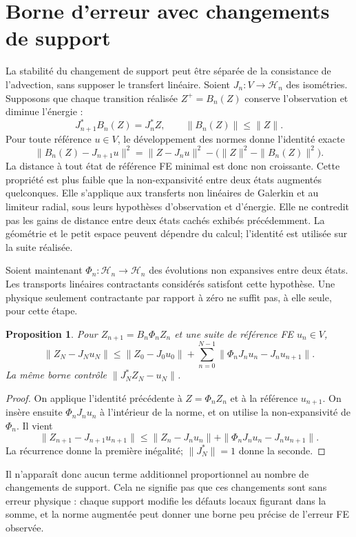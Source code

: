 \documentclass[11pt,a4paper]{article}
\newtheorem{proposition}{Proposition}
\begin{document}
\section{Borne d'erreur avec changements de support}
La stabilité du changement de support peut être séparée de la
consistance de l'advection, sans supposer le transfert linéaire.
Soient $J_n:V\to\mathcal H_n$ des isométries. Supposons que chaque
transition réalisée $Z^+=B_n(Z)$ conserve l'observation et diminue
l'énergie :
\[
 J_{n+1}^*B_n(Z)=J_n^*Z,\qquad \|B_n(Z)\|\leq\|Z\|.
\]
Pour toute référence $u\in V$, le développement des normes donne
l'identité exacte
\[
 \|B_n(Z)-J_{n+1}u\|^2
 =\|Z-J_nu\|^2-\bigl(\|Z\|^2-\|B_n(Z)\|^2\bigr).
\]
La distance à tout état de référence FE minimal est donc non croissante.
Cette propriété est plus faible que la non-expansivité entre deux
états augmentés quelconques. Elle s'applique aux transferts non linéaires
de Galerkin et au limiteur radial, sous leurs hypothèses d'observation
et d'énergie. Elle ne contredit pas les gains de distance entre deux
états cachés exhibés précédemment. La géométrie et le petit espace
peuvent dépendre du calcul; l'identité est utilisée sur la suite réalisée.

Soient maintenant $\Phi_n:\mathcal H_n\to\mathcal H_n$ des évolutions
non expansives entre deux états. Les transports linéaires contractants
considérés satisfont cette hypothèse. Une physique seulement contractante
par rapport à zéro ne suffit pas, à elle seule, pour cette étape.

\begin{proposition}
Pour $Z_{n+1}=B_n\Phi_n Z_n$ et une suite de référence FE $u_n\in V$,
\[
 \|Z_N-J_Nu_N\|\leq\|Z_0-J_0u_0\|
 +\sum_{n=0}^{N-1}\|\Phi_nJ_nu_n-J_nu_{n+1}\|.
\]
La même borne contrôle $\|J_N^*Z_N-u_N\|$.
\end{proposition}
\begin{proof}
On applique l'identité précédente à $Z=\Phi_nZ_n$ et à la référence
$u_{n+1}$. On insère ensuite $\Phi_nJ_nu_n$ à l'intérieur de la norme,
et on utilise la non-expansivité de $\Phi_n$. Il vient
\[
 \|Z_{n+1}-J_{n+1}u_{n+1}\|
 \leq \|Z_n-J_nu_n\|
 +\|\Phi_nJ_nu_n-J_nu_{n+1}\|.
\]
La récurrence donne la première inégalité; $\|J_N^*\|=1$ donne la seconde.
\end{proof}

Il n'apparaît donc aucun terme additionnel proportionnel au nombre de
changements de support. Cela ne signifie pas que ces changements sont
sans erreur physique : chaque support modifie les défauts locaux
figurant dans la somme, et la norme augmentée peut donner une borne
peu précise de l'erreur FE observée.
\end{document}
